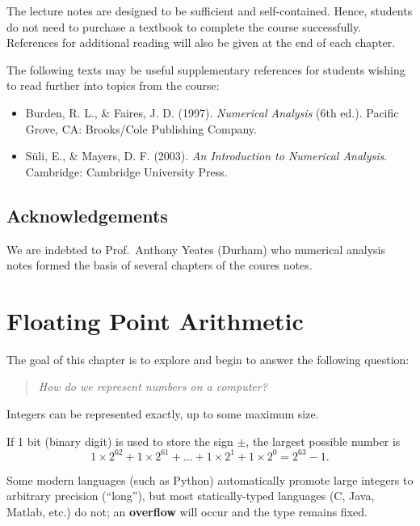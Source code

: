 \documentclass[
  letterpaper,
  DIV=11,
  numbers=noendperiod]{scrreprt}
\providecommand{\tightlist}{%
  \setlength{\itemsep}{0pt}\setlength{\parskip}{0pt}}
\begin{document}
The lecture notes are designed to be sufficient and self-contained.
Hence, students do not need to purchase a textbook to complete the
course successfully. References for additional reading will also be
given at the end of each chapter.

The following texts may be useful supplementary references for students
wishing to read further into topics from the course:

\begin{itemize}
\tightlist
\item
  Burden, R. L., \& Faires, J. D. (1997). \emph{Numerical Analysis} (6th
  ed.). Pacific Grove, CA: Brooks/Cole Publishing Company.
\item
  Süli, E., \& Mayers, D. F. (2003). \emph{An Introduction to Numerical
  Analysis}. Cambridge: Cambridge University Press.
\end{itemize}

\section*{Acknowledgements}\label{acknowledgements}


We are indebted to Prof.~Anthony Yeates (Durham) who numerical analysis
notes formed the basis of several chapters of the coures notes.


\chapter{Floating Point Arithmetic}\label{floating-point-arithmetic}

The goal of this chapter is to explore and begin to answer the following
question:

\begin{quote}
\emph{How do we represent numbers on a computer?}
\end{quote}

Integers can be represented exactly, up to some maximum size.

If 1 bit (binary digit) is used to store the sign \(\pm\), the largest
possible number is \[
1\times 2^{62} +1\times 2^{61} + \ldots + 1\times 2^{1} + 1\times 2^{0} = 2^{63}-1.
\]

\begin{tcolorbox}[enhanced jigsaw, bottomtitle=1mm, title=\textcolor{quarto-callout-note-color}{\faInfo}\hspace{0.5em}{Note}, colback=white, opacityback=0, rightrule=.15mm, bottomrule=.15mm, colbacktitle=quarto-callout-note-color!10!white, colframe=quarto-callout-note-color-frame, arc=.35mm, breakable, coltitle=black, leftrule=.75mm, left=2mm, toptitle=1mm, toprule=.15mm, titlerule=0mm, opacitybacktitle=0.6]

Some modern languages (such as Python) automatically promote large
integers to arbitrary precision (``long''), but most statically-typed
languages (C, Java, Matlab, etc.) do not; an \textbf{overflow} will
occur and the type remains fixed.

\end{tcolorbox}
\end{document}
